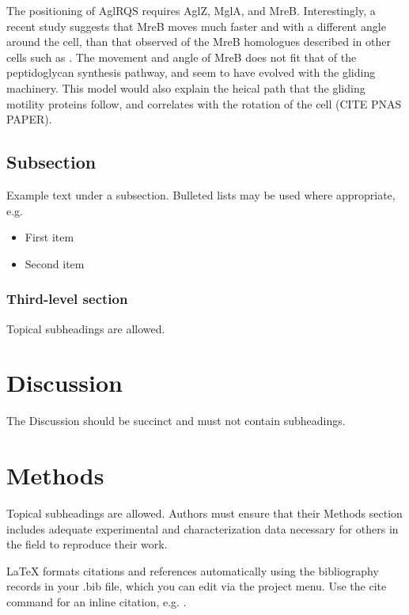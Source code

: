 \documentclass[fleqn,10pt]{wlscirep}
\begin{document}
The positioning of AglRQS requires AglZ, MglA, and MreB. Interestingly, a recent study suggests that MreB moves much faster and with a different angle around the cell, than that observed of the MreB homologues described in other cells such as \italicp[E. coli]. The movement and angle of MreB does not fit that of the peptidoglycan synthesis pathway, and seem to have evolved with the gliding machinery. This model would also explain the heical path that the gliding motility proteins follow, and correlates with the rotation of the cell (CITE PNAS PAPER).



\subsection*{Subsection}

Example text under a subsection. Bulleted lists may be used where appropriate, e.g.

\begin{itemize}
\item First item
\item Second item
\end{itemize}

\subsubsection*{Third-level section}
 
Topical subheadings are allowed.

\section*{Discussion}

The Discussion should be succinct and must not contain subheadings.

\section*{Methods}

Topical subheadings are allowed. Authors must ensure that their Methods section includes adequate experimental and characterization data necessary for others in the field to reproduce their work.



\noindent LaTeX formats citations and references automatically using the bibliography records in your .bib file, which you can edit via the project menu. Use the cite command for an inline citation, e.g.  \cite{Hao:gidmaps:2014}.
\end{document}
